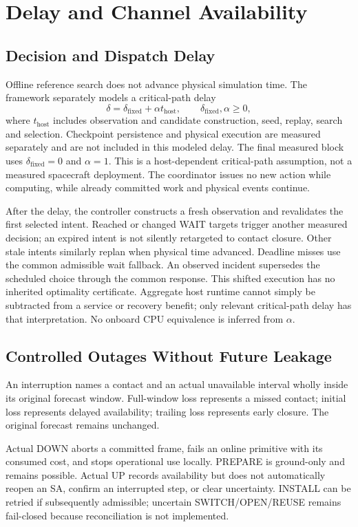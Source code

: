 \documentclass[conference]{IEEEtran}
\begin{document}
\section{Delay and Channel Availability}
\subsection{Decision and Dispatch Delay}
Offline reference search does not advance physical simulation time. The framework separately models a critical-path delay
\begin{equation}
\delta=\delta_{\mathrm{fixed}}+\alpha t_{\mathrm{host}},\qquad \delta_{\mathrm{fixed}},\alpha\geq0,
\end{equation}
where $t_{\mathrm{host}}$ includes observation and candidate construction, seed, replay, search and selection. Checkpoint persistence and physical execution are measured separately and are not included in this modeled delay. The final measured block uses $\delta_{\mathrm{fixed}}=0$ and $\alpha=1$. This is a host-dependent critical-path assumption, not a measured spacecraft deployment. The coordinator issues no new action while computing, while already committed work and physical events continue.

After the delay, the controller constructs a fresh observation and revalidates the first selected intent. Reached or changed WAIT targets trigger another measured decision; an expired intent is not silently retargeted to contact closure. Other stale intents similarly replan when physical time advanced. Deadline misses use the common admissible wait fallback. An observed incident supersedes the scheduled choice through the common response. This shifted execution has no inherited optimality certificate. Aggregate host runtime cannot simply be subtracted from a service or recovery benefit; only relevant critical-path delay has that interpretation. No onboard CPU equivalence is inferred from $\alpha$.

\subsection{Controlled Outages Without Future Leakage}
An interruption names a contact and an actual unavailable interval wholly inside its original forecast window. Full-window loss represents a missed contact; initial loss represents delayed availability; trailing loss represents early closure. The original forecast remains unchanged.

Actual DOWN aborts a committed frame, fails an online primitive with its consumed cost, and stops operational use locally. PREPARE is ground-only and remains possible. Actual UP records availability but does not automatically reopen an SA, confirm an interrupted step, or clear uncertainty. INSTALL can be retried if subsequently admissible; uncertain SWITCH/OPEN/REUSE remains fail-closed because reconciliation is not implemented.
\end{document}
